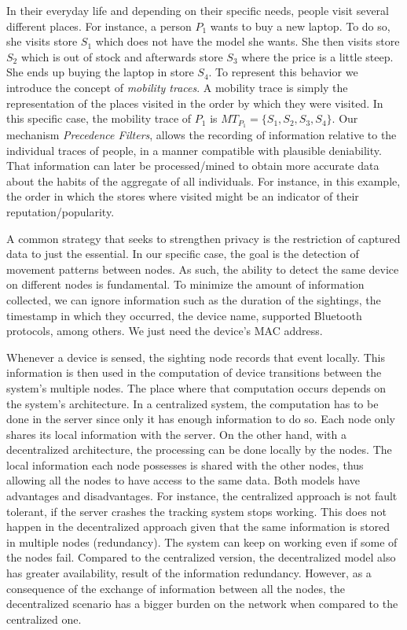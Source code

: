 In their everyday life and depending on their specific needs, people
visit several different places. For instance, a person $P_1$ wants to
buy a new laptop. To do so, she visits store $S_1$ which does not have
the model she wants. She then visits store $S_2$ which is out of
stock and afterwards store $S_3$ where the price is a little
steep. She ends up buying the laptop in store $S_4$. To represent this
behavior we introduce the concept of \emph{mobility traces}. A
mobility trace is simply the representation of the places visited in the
order by which they were visited. In this specific case, the mobility
trace of $P_1$ is $MT_{P_1}=\{S_1,S_2,S_3,S_4\}$. Our mechanism
\emph{Precedence Filters}, allows the recording of information
relative to the individual traces of people, in a manner compatible
with plausible deniability. That information can later be
processed/mined to obtain more accurate data about the habits of the
aggregate of all individuals. For instance, in this example, the order
in which the stores where visited might be an indicator of their
reputation/popularity.

A common strategy that seeks to strengthen privacy is the restriction
of captured data to just the essential. In our specific case, the goal
is the detection of movement patterns between nodes. As such, the
ability to detect the same device on different nodes is fundamental. To
minimize the amount of information collected, we can ignore
information such as the duration of the sightings, the timestamp in which
they occurred, the device name, supported Bluetooth protocols,
among others. We just need the device's MAC address.

Whenever a device is sensed, the sighting node records that event
locally. This information is then used in the computation of device
transitions between the system's multiple nodes. The place where that
computation occurs depends on the system's architecture. In a
centralized system, the computation has to be done in the server since
only it has enough information to do so. Each node only shares its
local information with the server. On the other hand, with a
decentralized architecture, the processing can be done locally by the
nodes. The local information each node possesses is shared with the other
nodes, thus allowing all the nodes to have access to the same
data. Both models have advantages and disadvantages. For instance, the
centralized approach is not fault tolerant, if the server crashes the
tracking system stops working. This does not happen in the
decentralized approach given that the same information is stored in
multiple nodes (redundancy). The system can keep on working even if
some of the nodes fail. Compared to the centralized version, the
decentralized model also has greater availability, result of the
information redundancy. However, as a consequence of the exchange of
information between all the nodes, the decentralized scenario has
a bigger burden on the network when compared to the centralized one.


